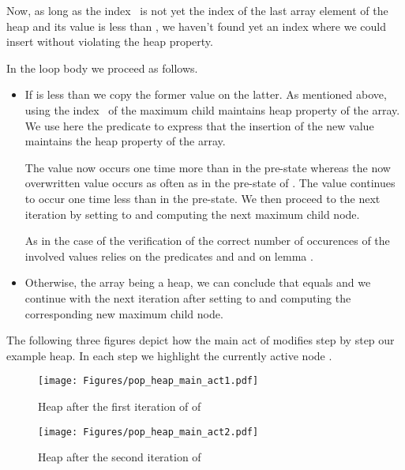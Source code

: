 Now, as long as the index~ is not yet the index of the last array element
of the heap and its value  is less than ,
we haven't found yet an index where we could insert  without
violating the heap property.

\clearpage

In the loop body we proceed as follows.

\begin{itemize}
\item
If  is less than  we copy the former value on 
the latter.
As mentioned above, using the index~ of the maximum child
maintains  heap property of the array.
We use here the predicate  to express
that the insertion of the new value  maintains the heap
property of the array.

The value  now occurs one time more than in the pre-state whereas
the now overwritten value  occurs as often as in the pre-state of \popheap.
The value  continues to occur one time less than in the pre-state.
%
We then proceed to the next iteration by setting  to 
and computing the next maximum child node.

As in the case of  the verification of 
the correct number of occurences of the involved values
relies on the predicates  and 
and on lemma .

\item
Otherwise, the array being a heap, we can conclude that
 equals  and we continue with the next iteration
after setting  to  and computing the corresponding
new maximum child node.
\end{itemize}

The following three figures depict how the main act of \popheap 
modifies step by step our example heap.
In each step we highlight the currently active node .


\begin{figure}[hbt]
\centering
\texttt{[image: Figures/pop\_heap\_main\_act1.pdf]}
\caption{Heap after the first iteration of of \popheap}
\end{figure}

\FloatBarrier

\begin{figure}[hbt]
\centering
\texttt{[image: Figures/pop\_heap\_main\_act2.pdf]}
\caption{Heap after the second iteration of \popheap}
\end{figure}

